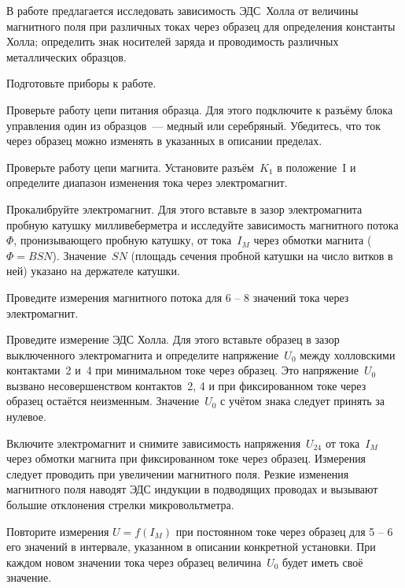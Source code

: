 \labtask

В работе предлагается исследовать зависимость ЭДС~Холла от величины магнитного
поля при различных токах через образец для определения константы Холла;
определить знак носителей заряда и проводимость различных металлических
образцов.

\begin{lab:task}

\item{Подготовьте приборы к работе.}

\item{ Проверьте работу цепи питания образца. Для этого подключите к разъёму
блока управления один из образцов~--- медный или серебряный. Убедитесь, что ток
через образец можно изменять в указанных в описании пределах.}
\item{ Проверьте работу цепи магнита. Установите разъём~$K_1$ в положение~I и
определите диапазон изменения тока через электромагнит.}
\item{ Прокалибруйте электромагнит. Для этого вставьте в зазор электромагнита
пробную катушку милливеберметра и исследуйте зависимость магнитного потока
$\Phi$, пронизывающего пробную катушку, от тока~$I_M$ через обмотки магнита
($\Phi=BSN$). Значение~$SN$ (площадь сечения пробной катушки на число витков в
ней) указано на держателе катушки.

Проведите измерения магнитного потока для 6 -- 8 значений тока через
электромагнит.}

\item{ Проведите измерение ЭДС Холла. Для этого вставьте образец в зазор
выключенного электромагнита и определите напряжение~$U_0$ между холловскими
контактами~2 и~4 при минимальном токе через образец. Это напряжение~$U_0$
вызвано несовершенством контактов~2, 4 и при фиксированном токе через образец
остаётся неизменным. Значение~$U_0$ с учётом знака следует принять за нулевое.

Включите электромагнит и снимите зависимость напряжения~$U_{24}$ от тока~$I_M$
через обмотки магнита при фиксированном токе через образец. Измерения следует
проводить при  увеличении магнитного поля. Резкие изменения
магнитного поля наводят ЭДС индукции в подводящих проводах и вызывают большие
отклонения стрелки микровольтметра.

Повторите измерения $U=f(I_{M})$ при постоянном токе через образец для 5 -- 6
его значений в интервале, указанном в описании конкретной установки. При каждом
новом значении тока через образец величина~$U_0$ будет иметь своё значение.

}
\end{lab:task}
